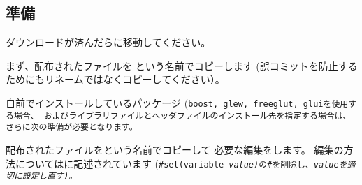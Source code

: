 \subsection{準備}
\label{subsec:PrepareLibrary}

\noindent
ダウンロードが済んだらに移動してください。

まず、配布されたファイルを
\CMakeLists{}という名前でコピーします
(誤コミットを防止するためにもリネームではなくコピーしてください）。

\medskip
\begin{narrow}[15pt]
\end{narrow}

\medskip
自前でインストールしているパッケージ
(\tt{boost}, \tt{glew}, \tt{freeglut}, \tt{glui}を使用する場合、
およびライブラリファイルとヘッダファイルのインストール先を指定する場合は、
さらに次の準備が必要となります。

配布されたファイルを\CMakeConf{}という名前でコピーして
必要な編集をします。
編集の方法については\CMakeConf{}に記述されています
(\tt{\#set(variable \it{value})}の\tt{\#}を削除し、\it{value}を適切に設定し直す)。

